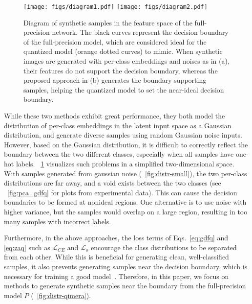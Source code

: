 \documentclass{article}
\newcommand{\loss}{\mathcal{L}}
\begin{document}
\begin{figure}
\centering
{}
	    {\texttt{[image: figs/diagram1.pdf]}}
	    {\texttt{[image: figs/diagram2.pdf]}}
\caption{Diagram of synthetic samples in the feature space of the full-precision network. The black curves represent the decision boundary of the full-precision model, which are considered ideal for the quantized model (orange dotted curves) to mimic. When synthetic images are generated with per-class embeddings and noises as in (a), their features do not support the decision boundary, whereas the proposed approach in (b) generates the boundary supporting samples, helping the quantized model to set the near-ideal decision boundary. }
	\label{fig:distr}
\end{figure}


While these two methods exhibit great performance, they both model the distribution of per-class embeddings in the latent input space as a Gaussian distribution, 
and generate diverse samples using random Gaussian noise inputs. 
However, based on the Gaussian distribution, it is difficult to correctly reflect the boundary between the two different classes, especially when all samples have one-hot labels. 
\figurename~\ref{fig:distr} visualizes such problems in a simplified two-dimensional space. 
With samples generated from gaussian noise (\figurename~\ref{fig:distr-small}), the two per-class distributions are far away, and a void exists between the two classes (see \figurename~\ref{fig:pca_gdfq} for plots from experimental data).  
This can cause the decision boundaries to be formed at nonideal regions.
One alternative is to use noise with higher variance, but the samples would overlap on a large region, resulting in too many samples with incorrect labels.



Furthermore, in the above approaches, the loss terms of Eqs.~\ref{eq:gdfq} and \ref{eq:zaq} such as $\loss_{CE}$ and $\loss_o$ encourage the class distributions to be separated from each other. 
While this is beneficial for generating clean, well-classified samples, it also prevents generating samples near the decision boundary, which is necessary for training a good model~\cite{heo2019knowledge, dong2020adversarial}. 
Therefore, in this paper, we focus on methods to generate synthetic samples near the boundary from the full-precision model $P$ (\figurename~\ref{fig:distr-qimera}).
\end{document}
